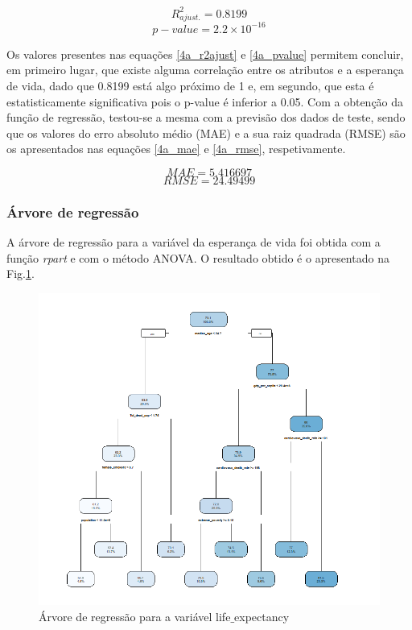 \documentclass[conference]{IEEEtran}
\begin{document}
\begin{equation}
R^{2}_{ajust.} = 0.8199\label{4a_r2ajust}
\end{equation}
\begin{equation}
p-value = 2.2\times 10^{-16}\label{4a_pvalue}
\end{equation}

Os valores presentes nas equações \eqref{4a_r2ajust} e \eqref{4a_pvalue} permitem concluir, em primeiro lugar, que existe alguma correlação entre os atributos e a esperança de vida, dado que 0.8199 está algo próximo de 1 e, em segundo, que esta é estatisticamente significativa pois o p-value é inferior a 0.05.
Com a obtenção da função de regressão, testou-se a mesma com a previsão dos dados de teste, sendo que os valores do erro absoluto médio (MAE) e a sua raiz quadrada (RMSE) são os apresentados nas equações \eqref{4a_mae} e \eqref{4a_rmse}, respetivamente.

\begin{equation}
MAE=5.416697\label{4a_mae}
\end{equation}
\begin{equation}
RMSE=24.49499\label{4a_rmse}
\end{equation}


\subsubsection{Árvore de regressão}
A árvore de regressão para a variável da esperança de vida foi obtida com a função \textit{rpart} e com o método ANOVA. O resultado obtido é o apresentado na Fig.\ref{4b}.

\begin{figure}[htbp]
\centerline{\includegraphics[width=0.95\columnwidth]{images/04_2.png}}
\caption{Árvore de regressão para a variável life$\_$expectancy}
\label{4b}
\end{figure}
\end{document}
